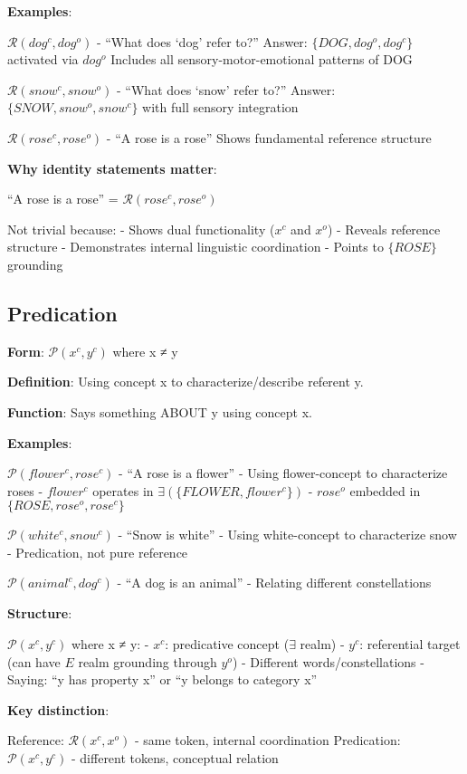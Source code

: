 \documentclass[12pt]{article}
\begin{document}
\textbf{Examples}:

\(\mathcal{R}(dog^c, dog^o)\) - ``What does `dog' refer to?'' Answer: \(\{DOG, dog^o, dog^c\}\) activated via \(dog^o\) Includes all sensory-motor-emotional patterns of DOG

\(\mathcal{R}(snow^c, snow^o)\) - ``What does `snow' refer to?'' Answer: \(\{SNOW, snow^o, snow^c\}\) with full sensory integration

\(\mathcal{R}(rose^c, rose^o)\) - ``A rose is a rose'' Shows fundamental reference structure

\textbf{Why identity statements matter}:

``A rose is a rose'' = \(\mathcal{R}(rose^c, rose^o)\)

Not trivial because: - Shows dual functionality (\(x^c\) and \(x^o\)) - Reveals reference structure - Demonstrates internal linguistic coordination - Points to \(\{ROSE\}\) grounding

\subsection{Predication}\label{predication}

\textbf{Form}: \(\mathcal{P}(x^c, y^c)\) where x ≠ y

\textbf{Definition}: Using concept x to characterize/describe referent y.

\textbf{Function}: Says something ABOUT y using concept x.

\textbf{Examples}:

\(\mathcal{P}(flower^c, rose^c)\) - ``A rose is a flower'' - Using flower-concept to characterize roses - \(flower^c\) operates in \(\exists(\{FLOWER, flower^c\})\) - \(rose^o\) embedded in \(\{ROSE, rose^o, rose^c\}\)

\(\mathcal{P}(white^c, snow^c)\) - ``Snow is white'' - Using white-concept to characterize snow - Predication, not pure reference

\(\mathcal{P}(animal^c, dog^c)\) - ``A dog is an animal'' - Relating different constellations

\textbf{Structure}:

\(\mathcal{P}(x^c, y^c)\) where x ≠ y: - \(x^c\): predicative concept (\(\exists\) realm) - \(y^c\): referential target (can have \(E\) realm grounding through \(y^o\)) - Different words/constellations - Saying: ``y has property x'' or ``y belongs to category x''

\textbf{Key distinction}:

Reference: \(\mathcal{R}(x^c, x^o)\) - same token, internal coordination Predication: \(\mathcal{P}(x^c, y^c)\) - different tokens, conceptual relation
\end{document}

